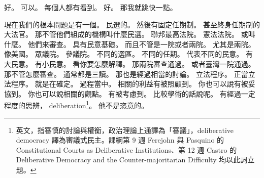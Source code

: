 \hypertarget{w01:cue:260}{}好。
\hypertarget{w01:cue:261}{}可以。
\hypertarget{w01:cue:262}{}每個人都有看到。
\hypertarget{w01:cue:263}{}好。
\hypertarget{w01:cue:264}{}那我就跳快一點。

\hypertarget{w01:cue:265}{}現在我們的根本問題是有一個。
\hypertarget{w01:cue:266}{}民選的。
\hypertarget{w01:cue:267}{}然後有固定任期制。
\hypertarget{w01:cue:268}{}甚至終身任期制的大法官。
\hypertarget{w01:cue:269}{}那不管他們組成的機構叫什麼民選。
\hypertarget{w01:cue:270}{}聯邦最高法院。
\hypertarget{w01:cue:271}{}憲法法院。
\hypertarget{w01:cue:272}{}或叫什麼。
\hypertarget{w01:cue:273}{}他們來審查。
\hypertarget{w01:cue:274}{}具有民意基礎。
\hypertarget{w01:cue:275}{}而且不管是一院或者兩院。
\hypertarget{w01:cue:276}{}尤其是兩院。
\hypertarget{w01:cue:277}{}像美國。
\hypertarget{w01:cue:278}{}眾議院。
\hypertarget{w01:cue:279}{}參議院。
\hypertarget{w01:cue:280}{}不同的選區。
\hypertarget{w01:cue:281}{}不同的任期。
\hypertarget{w01:cue:282}{}代表不同的民意。
\hypertarget{w01:cue:283}{}有大民意。
\hypertarget{w01:cue:284}{}有小民意。
\hypertarget{w01:cue:285}{}看你要怎麼解釋。
\hypertarget{w01:cue:286}{}那兩院審查通過。
\hypertarget{w01:cue:287}{}或者臺灣一院通過。
\hypertarget{w01:cue:288}{}那不管怎麼審查。
\hypertarget{w01:cue:289}{}通常都是三讀。
\hypertarget{w01:cue:290}{}那也是經過相當的討論。
\hypertarget{w01:cue:291}{}立法程序。
\hypertarget{w01:cue:292}{}正當立法程序。
\hypertarget{w01:cue:293}{}就是在確定。
\hypertarget{w01:cue:294}{}過程當中。
\hypertarget{w01:cue:295}{}相關的利益有被照顧到。
\hypertarget{w01:cue:296}{}你也可以說有被妥協到。
\hypertarget{w01:cue:297}{}你也可以說相關的觀點。
\hypertarget{w01:cue:298}{}有被考慮到。
\hypertarget{w01:cue:299}{}比較學術的話說呢。
\hypertarget{w01:cue:300}{}有經過一定程度的思辨，
\hypertarget{w01:cue:301}{}deliberation\footnote{英文，指審慎的討論與權衡，政治理論上通譯為「審議」，deliberative democracy 譯為審議式民主。課綱第 9 週 Ferejohn 與 Pasquino 的 Constitutional Courts as Deliberative Institutions、第 12 週 Castro 的 Deliberative Democracy and the Counter-majoritarian Difficulty 均以此詞立題。}。
\hypertarget{w01:cue:302}{}他不是恣意的。

